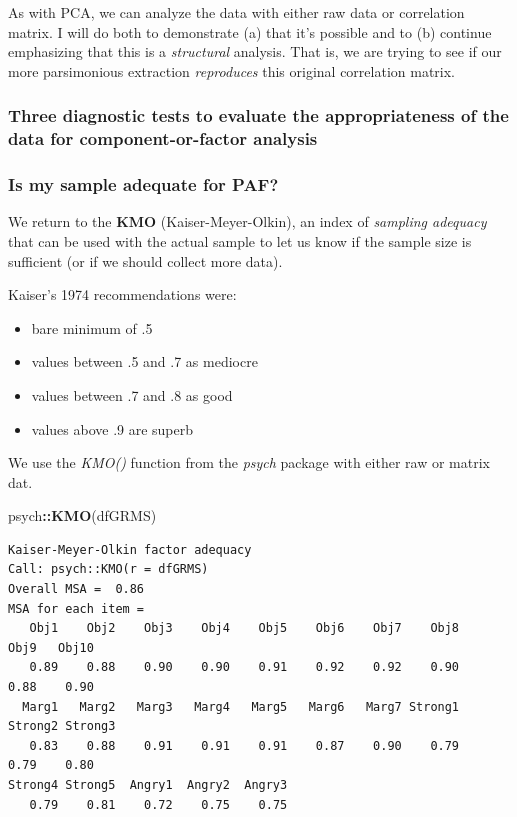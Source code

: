 \documentclass[
  english,
]{book}
\newenvironment{Shaded}{\begin{snugshade}}{\end{snugshade}}
\newcommand{\KeywordTok}[1]{\textcolor[rgb]{0.13,0.29,0.53}{\textbf{#1}}}
\newcommand{\NormalTok}[1]{#1}
\newcommand{\OperatorTok}[1]{\textcolor[rgb]{0.81,0.36,0.00}{\textbf{#1}}}
\providecommand{\tightlist}{%
  \setlength{\itemsep}{0pt}\setlength{\parskip}{0pt}}
\begin{document}
As with PCA, we can analyze the data with either raw data or correlation matrix. I will do both to demonstrate (a) that it's possible and to (b) continue emphasizing that this is a \emph{structural} analysis. That is, we are trying to see if our more parsimonious extraction \emph{reproduces} this original correlation matrix.

\hypertarget{three-diagnostic-tests-to-evaluate-the-appropriateness-of-the-data-for-component-or-factor-analysis-1}{%
\subsubsection{Three diagnostic tests to evaluate the appropriateness of the data for component-or-factor analysis}\label{three-diagnostic-tests-to-evaluate-the-appropriateness-of-the-data-for-component-or-factor-analysis-1}}

\hypertarget{is-my-sample-adequate-for-paf}{%
\subsubsection{Is my sample adequate for PAF?}\label{is-my-sample-adequate-for-paf}}

We return to the \textbf{KMO} (Kaiser-Meyer-Olkin), an index of \emph{sampling adequacy} that can be used with the actual sample to let us know if the sample size is sufficient (or if we should collect more data).

Kaiser's 1974 recommendations were:

\begin{itemize}
\tightlist
\item
  bare minimum of .5
\item
  values between .5 and .7 as mediocre
\item
  values between .7 and .8 as good
\item
  values above .9 are superb
\end{itemize}

We use the \emph{KMO()} function from the \emph{psych} package with either raw or matrix dat.

\begin{Shaded}
\begin{Highlighting}[]
\NormalTok{psych}\OperatorTok{::}\KeywordTok{KMO}\NormalTok{(dfGRMS)}
\end{Highlighting}
\end{Shaded}

\begin{verbatim}
Kaiser-Meyer-Olkin factor adequacy
Call: psych::KMO(r = dfGRMS)
Overall MSA =  0.86
MSA for each item = 
   Obj1    Obj2    Obj3    Obj4    Obj5    Obj6    Obj7    Obj8    Obj9   Obj10 
   0.89    0.88    0.90    0.90    0.91    0.92    0.92    0.90    0.88    0.90 
  Marg1   Marg2   Marg3   Marg4   Marg5   Marg6   Marg7 Strong1 Strong2 Strong3 
   0.83    0.88    0.91    0.91    0.91    0.87    0.90    0.79    0.79    0.80 
Strong4 Strong5  Angry1  Angry2  Angry3 
   0.79    0.81    0.72    0.75    0.75 
\end{verbatim}
\end{document}
